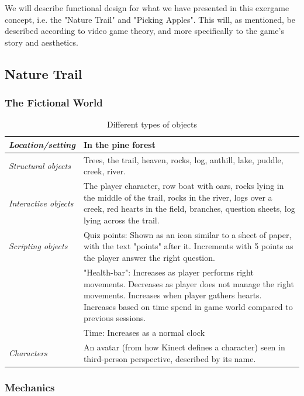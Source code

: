 We will describe functional design for what we have presented in this exergame concept, i.e. the "Nature Trail" and "Picking Apples". This will, as mentioned, be described according to video game theory, and more specifically to the game's story and aesthetics.  

\subsection{Nature Trail}

\subsubsection{The Fictional World} 

\begin{table} [H]
\centering
\begin{tabular}{|p{}|p{}|}
\hline
\emph{Location/setting} & In the pine forest  \\ \hline
\emph{Structural objects} & Trees, the trail, heaven, rocks, log, anthill, lake, puddle, creek, river.  \\ \hline
\emph{Interactive objects} & The player character, row boat with oars, rocks lying in the middle of the trail, rocks in the river, logs over a creek, red hearts in the field, branches, question sheets, log lying across the trail. \\ \hline
\emph{Scripting objects} & Quiz points: Shown as an icon similar to a sheet of paper, with the text "points" after it. Increments with 5 points as the player answer the right question.\\ \hline
	     & "Health-bar": Increases as player performs right movements. Decreases as player does not manage the right movements. Increases when player gathers hearts. Increases based on time spend in game world compared to previous sessions. 
	      \\ \hline
	       & Time: Increases as a normal clock \\ \hline
\emph{Characters} & An avatar (from how Kinect defines a character) seen in third-person perspective, described by its name. \\ \hline
    \end{tabular}
    \caption[Various objects in the "Nature Trail"]{Different types of objects}
    \label{tab:objects1}
\end{table}  

\subsubsection{Mechanics} 

